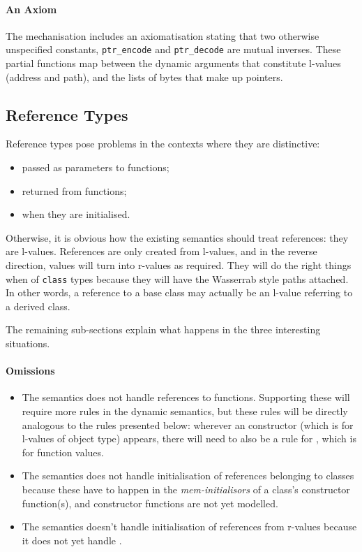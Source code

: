 \documentclass[11pt]{article}
\begin{document}
\paragraph{An Axiom}
The mechanisation includes an axiomatisation stating that two
otherwise unspecified constants, \texttt{ptr\_encode} and
\texttt{ptr\_decode} are mutual inverses.  These partial functions map
between the dynamic arguments that constitute l-values (address and
path), and the lists of bytes that make up pointers.

\subsection{Reference Types}
\label{sec:reftypes}

Reference types pose problems in the contexts where they are
distinctive:
\begin{itemize}
\item passed as parameters to functions;
\item returned from functions;
\item when they are initialised.
\end{itemize}

Otherwise, it is obvious how the existing semantics should treat
references: they are l-values.  References are only created from
l-values, and in the reverse direction, values will turn into r-values
as required.  They will do the right things when of \texttt{class}
types because they will have the Wasserrab style paths attached.  In
other words, a reference to a base class may actually be an l-value
referring to a derived class.

The remaining sub-sections explain what happens in the three
interesting situations.

\paragraph{Omissions}
\begin{itemize}
\item The semantics does not handle references to functions.
  Supporting these will require more rules in the dynamic semantics,
  but these rules will be directly analogous to the rules presented
  below: wherever an \clvalue{} constructor (which is for l-values of
  object type) appears, there will need to also be a rule for
  \cfvalue{}, which is for function values.
\item The semantics does not handle initialisation of references
  belonging to classes because these have to happen in the
  \emph{mem-initialisors} of a class's constructor function(s), and
  constructor functions are not yet modelled.
\item The semantics doesn't handle initialisation of 
  references from r-values because it does not yet handle
  .
\end{itemize}
\end{document}
